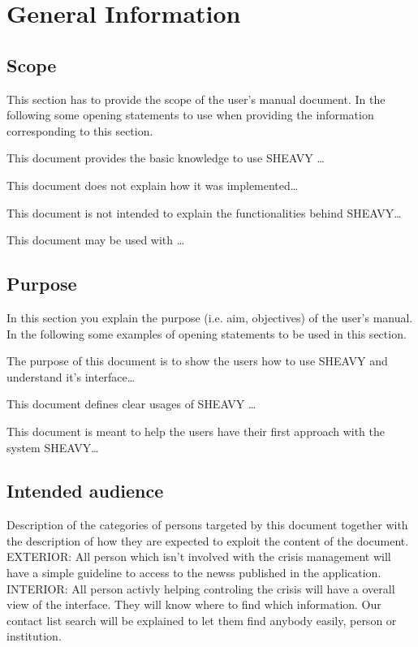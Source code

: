 \chapter{General Information}

\label{chap:introduction}

\section{Scope}
This section has to provide the scope of the user's manual document.
In the following some opening statements to use when providing the
information corresponding to this section.

This document provides the basic knowledge to use SHEAVY \ldots


This document does not explain how it was implemented\ldots 
 
This document is not intended to explain the functionalities behind SHEAVY\ldots

 
This document may be used with \ldots




\section{Purpose}
In this section you explain the purpose (i.e. aim, objectives) of the user's
manual. In the following some examples of opening statements to be used in this
section.

The purpose of this document is to show the users how to use SHEAVY and
understand it's interface\ldots

This document defines clear usages of SHEAVY \ldots

This document is meant to help the users have their first approach with
the system SHEAVY\ldots



\section{Intended audience}
Description of the categories of persons targeted by this document together with the description of how they are expected to exploit the content of the document.
EXTERIOR: All person which isn't involved with the crisis management will have a
simple guideline to access to the newss published in the application.
INTERIOR: All person activly helping controling the crisis will have a overall
view of the interface. They will know where to find which information. Our
contact list search will be explained to let them find anybody easily, person or
institution.

